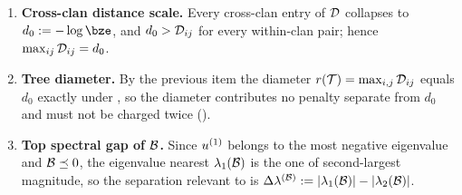 \begin{enumerate}
\item \textbf{Cross-clan distance scale.} Every cross-clan entry of $\mathcal{D}$
collapses to $d_0:=-\log\bze$, and $d_0>\mathcal{D}_{ij}$ for every within-clan pair;
hence $\max_{ij}\mathcal{D}_{ij}=d_0$.
\item \textbf{Tree diameter.} By the previous item the diameter
$r(\mathcal T)=\max_{i,j}\mathcal{D}_{ij}$ equals $d_0$ exactly under
, so the diameter contributes no penalty separate from $d_0$ and
must not be charged twice ().
\item \textbf{Top spectral gap of $\mathcal{B}$.} Since $u^{(1)}$ belongs to the most
negative eigenvalue and $\mathcal{B}\preceq0$, the eigenvalue nearest $\lambda_1(\mathcal{B})$
is the one of second-largest magnitude, so the separation relevant to
 is $\Delta\lambda^{(\mathcal{B})}:=|\lambda_1(\mathcal{B})|-|\lambda_2(\mathcal{B})|$.
\end{enumerate}

